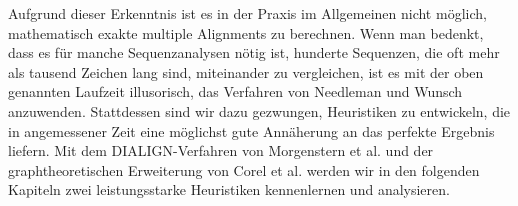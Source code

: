 Aufgrund dieser Erkenntnis ist es in der Praxis im Allgemeinen nicht möglich, mathematisch exakte multiple Alignments zu berechnen. Wenn man bedenkt, dass es für manche Sequenzanalysen nötig ist, hunderte Sequenzen, die oft mehr als tausend Zeichen lang sind, miteinander zu vergleichen, ist es mit der oben genannten Laufzeit illusorisch, das Verfahren von Needleman und Wunsch anzuwenden. Stattdessen sind wir dazu gezwungen, Heuristiken zu entwickeln, die in angemessener Zeit eine möglichst gute Annäherung an das perfekte Ergebnis liefern. Mit dem DIALIGN-Verfahren von Morgenstern et al. \cite{mdw96} und der graphtheoretischen Erweiterung von Corel et al. \cite{cpm10} werden wir in den folgenden Kapiteln zwei leistungsstarke Heuristiken kennenlernen und analysieren.